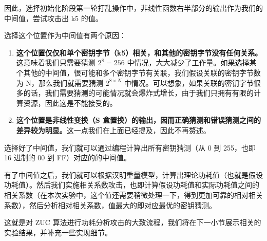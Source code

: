 因此，选择初始化阶段第一轮打乱操作中，非线性函数右半部分的输出作为我们的中间值，尝试攻击出 k5 的值。

\vspace*{\baselineskip}

选择这个位置作为中间值有两个原因：

\begin{enumerate}
    \item \textbf{这个位置仅仅和单个密钥字节（k5）相关，和其他的密钥字节没有任何关系。}这意味着我们只需要猜测 $2^8=256$ 中情况，大大减少了工作量。如果选择某个其他的中间值，很可能和多个密钥字节有关联，我们假设关联的密钥字节数为 N，那么我们就需要猜测 $2^{8 \times N}$ 中情况。可以想象，如果关联的密钥字节很多的话，我们需要猜测的可能情况就会爆炸式增长，由于我们只拥有有限的计算资源，因此这是不能接受的。
    \item \textbf{这个位置是非线性变换（S 盒置换）的输出，因而正确猜测和错误猜测之间的差异较为明显。}这一点我们在上面已经提及，因此不再赘述。
\end{enumerate}

\vspace*{\baselineskip}

选择好了中间值，我们就可以通过编程计算出所有密钥猜测（从 0 到 255，也即 16 进制的 00 到 FF）对应的的中间值。

有了中间值之后，我们就可以根据汉明重量模型，计算出理论功耗值（也就是假设功耗值）。然后我们实施相关系数攻击，也即计算假设功耗值和实际功耗值之间的相关系数（在本次实验中，这个值还需要稍微处理一下，得到更加可靠的相对相关系数），然后分析相对相关系数，值最大的即对应最优的密钥猜测。

这就是对 ZUC 算法进行功耗分析攻击的大致流程，我们将在下一小节展示相关的实验结果，并补充一些实现细节。



